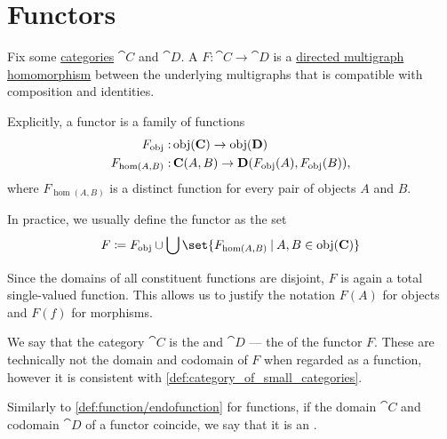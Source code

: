 \section{Functors}\label{sec:functors}

\begin{definition}\label{def:functor}
  Fix some \hyperref[def:category]{categories} \( \cat{C} \) and \( \cat{D} \). A  \( F: \cat{C} \to \cat{D} \) is a \hyperref[def:directed_multigraph/homomorphism]{directed multigraph homomorphism} between the underlying multigraphs that is compatible with composition and identities.

  Explicitly, a functor is a family of functions
  \begin{equation}\label{eq:def:functor_as_family_of_function}
    \begin{aligned}
      F_{\obj}:       &\obj(\cat{C}) \to \obj(\cat{D}) \\
      F_{\hom(A, B)}: &\cat{C}(A, B) \to \cat{D}(F_{\obj}(A), F_{\obj}(B)),
    \end{aligned}
  \end{equation}
  where \( F_{\hom(A, B)} \) is a distinct function for every pair of objects \( A \) and \( B \).

  In practice, we usually define the functor as the set
  \begin{equation}\label{eq:def:functor_as_single_function}
    F \coloneqq F_{\obj} \cup \bigcup\set{ F_{\hom(A, B)} \given A, B \in \obj(\cat{C}) }
  \end{equation}

  Since the domains of all constituent functions are disjoint, \( F \) is again a total single-valued function. This allows us to justify the notation \( F(A) \) for objects and \( F(f) \) for morphisms.

  \begin{thmenum}[resume=def:functor]
     We say that the category \( \cat{C} \) is the  and \( \cat{D} \) --- the  of the functor \( F \). These are technically not the domain and codomain of \( F \) when regarded as a function, however it is consistent with \cref{def:category_of_small_categories}.

     Similarly to \cref{def:function/endofunction} for functions, if the domain \( \cat{C} \) and codomain \( \cat{D} \) of a functor coincide, we say that it is an .
  \end{thmenum}


\end{definition}

